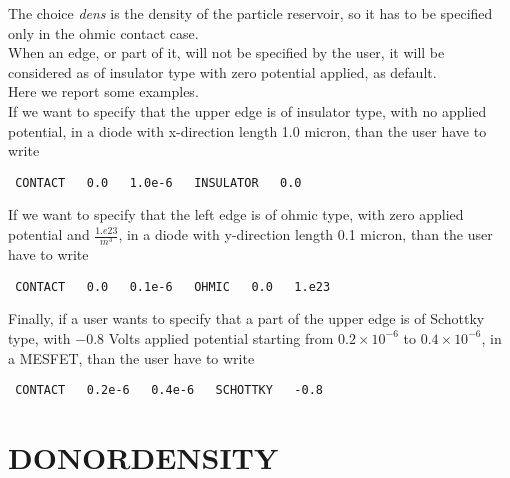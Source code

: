\documentclass[12pt]{book}
\begin{document}
The choice \textsl{dens} is the density of the particle reservoir, so it has to be specified only in the ohmic contact case.\\

When an edge, or part of it, will not be specified by the user, it will be considered as of insulator type with zero potential applied, as default.\\

Here we report some examples.\\

If we want to specify that the upper edge is of insulator type, with no applied potential, in a diode with x-direction length 1.0 micron, than the user have to write
\begin{verbatim}
 CONTACT   0.0   1.0e-6   INSULATOR   0.0
\end{verbatim}

If we want to specify that the left edge is of ohmic type, with zero applied potential and $\frac{1.e23}{m^3}$, in a diode with y-direction length 0.1 micron, than the user have to write
\begin{verbatim}
 CONTACT   0.0   0.1e-6   OHMIC   0.0   1.e23
\end{verbatim}

Finally, if a user wants to specify that a part of the upper edge is of Schottky type, with $-0.8$ Volts applied potential starting from $0.2 \times 10^{-6}$ to $0.4 \times 10^{-6}$, in a MESFET, than the user have to write
\begin{verbatim}
 CONTACT   0.2e-6   0.4e-6   SCHOTTKY   -0.8
\end{verbatim}

\section{DONORDENSITY}
\end{document}
